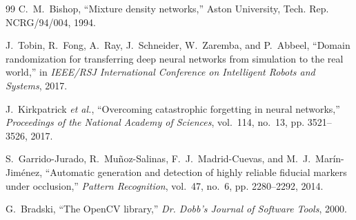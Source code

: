 \documentclass[letterpaper, 10pt, conference]{ieeeconf}
\begin{document}
\begin{thebibliography}{99}
C.~M.~Bishop, ``Mixture density networks,'' Aston University, Tech. Rep.
NCRG/94/004, 1994.

J.~Tobin, R.~Fong, A.~Ray, J.~Schneider, W.~Zaremba, and P.~Abbeel, ``Domain
randomization for transferring deep neural networks from simulation to the
real world,'' in \emph{IEEE/RSJ International Conference on Intelligent
Robots and Systems}, 2017.

J.~Kirkpatrick \emph{et al.}, ``Overcoming catastrophic forgetting in neural
networks,'' \emph{Proceedings of the National Academy of Sciences}, vol.~114,
no.~13, pp. 3521--3526, 2017.

S.~Garrido-Jurado, R.~Mu\~{n}oz-Salinas, F.~J.~Madrid-Cuevas, and
M.~J.~Mar\'{i}n-Jim\'{e}nez, ``Automatic generation and detection of highly
reliable fiducial markers under occlusion,'' \emph{Pattern Recognition},
vol.~47, no.~6, pp. 2280--2292, 2014.

G.~Bradski, ``The OpenCV library,'' \emph{Dr. Dobb's Journal of Software
Tools}, 2000.

\end{thebibliography}
\end{document}
